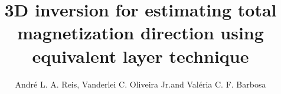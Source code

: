 \documentclass[manuscript,revised]{geophysics}
\begin{document}
\title{3D inversion for estimating total magnetization direction using equivalent layer technique}

\renewcommand{\thefootnote}{\fnsymbol{footnote}} 


\address{
\footnotemark[2] Observat\'orio Nacional, Rio de Janeiro, Brazil\\
\footnotemark[1] Corresponding author: decoluisreis@gmail.com}
\author{Andr\'e L. A. Reis\footnotemark[2] \footnotemark[1], Vanderlei C. Oliveira Jr.\footnotemark[2] and Val\'eria C. F. Barbosa \footnotemark[2]}


\maketitle



%

\end{document}
